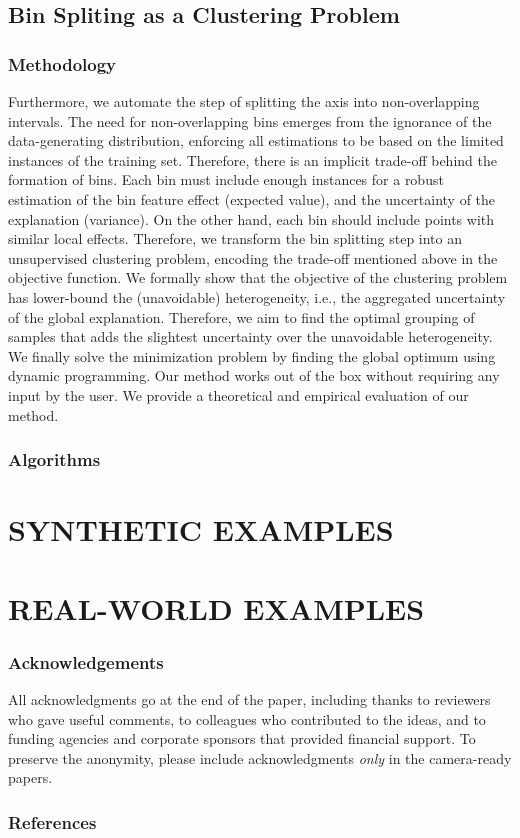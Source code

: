 \documentclass[twoside]{article}
\begin{document}
\subsection{Bin Spliting as a Clustering Problem}

\subsubsection{Methodology}

Furthermore, we automate the step of splitting the axis into non-overlapping intervals. The need for non-overlapping bins emerges from the ignorance of the data-generating distribution, enforcing all estimations to be based on the limited instances of the training set. Therefore, there is an implicit trade-off behind the formation of bins. Each bin must include enough instances for a robust estimation of the bin feature effect (expected value), and the uncertainty of the explanation (variance). On the other hand, each bin should include points with similar local effects. Therefore, we transform the bin splitting step into an unsupervised clustering problem, encoding the trade-off mentioned above in the objective function. We formally show that the objective of the clustering problem has lower-bound the (unavoidable) heterogeneity, i.e., the aggregated uncertainty of the global explanation. Therefore, we aim to find the optimal grouping of samples that adds the slightest uncertainty over the unavoidable heterogeneity. We finally solve the minimization problem by finding the global optimum using dynamic programming. Our method works out of the box without requiring any input by the user. We provide a theoretical and empirical evaluation of our method.


\subsubsection{Algorithms}

\section{SYNTHETIC EXAMPLES}

\section{REAL-WORLD EXAMPLES}


\subsubsection*{Acknowledgements}
All acknowledgments go at the end of the paper, including thanks to reviewers who gave useful comments, to colleagues who contributed to the ideas, and to funding agencies and corporate sponsors that provided financial support. 
To preserve the anonymity, please include acknowledgments \emph{only} in the camera-ready papers.

\subsubsection*{References}


\end{document}
